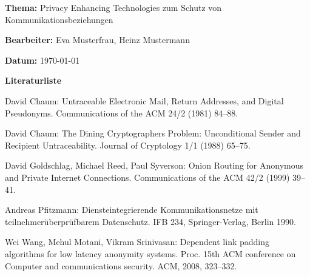 \documentclass[
    12pt,
    headings=small,
    parskip=half,           %
    bibliography=totoc,
    numbers=noenddot,       %
    open=any,               %
    ]{scrreprt}
\begin{document}
\newpage
\thispagestyle{empty}
\label{sec:literaturliste}
\par\textbf{\textsf{Thema:}} Privacy Enhancing Technologies zum Schutz von Kommunikationsbeziehungen
\par\textbf{\textsf{Bearbeiter:}} Eva Musterfrau, Heinz Mustermann
\par\textbf{\textsf{Datum:}} \today
\bigskip
\par\textbf{\Large\textsf{Literaturliste}}

David Chaum: Untraceable Electronic Mail, Return Addresses, and Digital Pseudonyms. Communications of the ACM 24/2 (1981) 84--88.

David Chaum: The Dining Cryptographers Problem: Unconditional Sender and Recipient Untraceability. Journal of Cryptology 1/1 (1988) 65--75.

David Goldschlag, Michael Reed, Paul Syverson: Onion Routing for Anonymous and Private Internet Connections. Communications of the ACM 42/2 (1999) 39--41.

Andreas Pfitzmann: Diensteintegrierende Kommunikationsnetze mit teilnehmerüberprüfbarem Datenschutz. IFB 234, Springer-Verlag, Berlin 1990.

Wei Wang, Mehul Motani, Vikram Srinivasan: Dependent link padding algorithms for low latency anonymity systems. Proc. 15th ACM conference on Computer and communications security. ACM, 2008, 323--332.


\listoftodos
\end{document}
